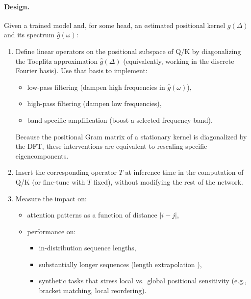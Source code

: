 \documentclass[11pt]{article}
\theoremstyle{definition}
\begin{document}
\paragraph{Design.}
Given a trained model and, for some head, an estimated positional kernel \(g(\Delta)\) and its spectrum \(\hat{g}(\omega)\):

\begin{enumerate}
    \item Define linear operators on the positional subspace of Q/K by diagonalizing the Toeplitz approximation \(\hat{g}(\Delta)\) (equivalently, working in the discrete Fourier basis). Use that basis to implement:
    \begin{itemize}
        \item low-pass filtering (dampen high frequencies in \(\hat{g}(\omega)\)),
        \item high-pass filtering (dampen low frequencies),
        \item band-specific amplification (boost a selected frequency band).
    \end{itemize}
    Because the positional Gram matrix of a stationary kernel is diagonalized by the DFT, these interventions are equivalent to rescaling specific eigencomponents.
    \item Insert the corresponding operator \(T\) at inference time in the computation of Q/K (or fine-tune with \(T\) fixed), without modifying the rest of the network.
    \item Measure the impact on:
    \begin{itemize}
        \item attention patterns as a function of distance \(|i-j|\),
        \item performance on:
        \begin{itemize}
            \item in-distribution sequence lengths,
            \item substantially longer sequences (length extrapolation \cite{press2022train,kazemnejad2024lengthgen}),
            \item synthetic tasks that stress local vs.\ global positional sensitivity (e.g., bracket matching, local reordering).
        \end{itemize}
    \end{itemize}
\end{enumerate}
\end{document}
